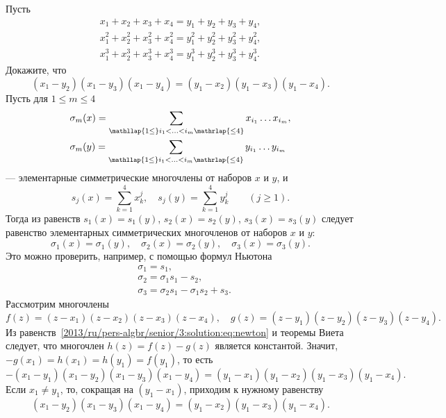 \problem
Пусть
\begin{gather*}
    x_1 + x_2 + x_3 + x_4 = y_1 + y_2 + y_3 + y_4
,\\
    x_1^2 + x_2^2 + x_3^2 + x_4^2
=
    y_1^2 + y_2^2 + y_3^2 + y_4^2
,\\
    x_1^3 + x_2^3 + x_3^3 + x_4^3
=
    y_1^3 + y_2^3 + y_3^3 + y_4^3
.\end{gather*}
Докажите, что
\[
    (x_1 - y_2) (x_1 - y_3) (x_1 - y_4)
=
    (y_1 - x_2) (y_1 - x_3) (y_1 - x_4)
.\]
\solution
Пусть для $1 \leq m \leq 4$
\begin{align*}&
    \sigma_m(x)
=
    \sum\limits_{\mathllap{1 \leq} i_1 < \ldots < i_m \mathrlap{\leq 4}}
        x_{i_1} \ldots x_{i_m}
,\\&
    \sigma_m(y)
=
    \sum\limits_{\mathllap{1 \leq} i_1 < \ldots < i_m \mathrlap{\leq 4}}
        y_{i_1} \ldots y_{i_m}
\end{align*}
--- элементарные симметрические многочлены от наборов $x$ и $y$, и
\[
    s_j(x)
=
    \sum\limits_{k = 1}^{4}
        x_k^j
,\quad
    s_j(y)
=
    \sum\limits_{k = 1}^{4}
        y_k^j
\qquad
    (j \geq 1)
.\]
Тогда из равенств $s_1(x) = s_1(y)$, $s_2(x) = s_2(y)$, $s_3(x) = s_3(y)$
следует равенство элементарных симметрических многочленов
от наборов $x$ и $y$:
\begin{equation} \label{2013/ru/pers-algbr/senior/3:solution:eq:newton}
    \sigma_1(x) = \sigma_1(y)
,\quad
    \sigma_2(x) = \sigma_2(y)
,\quad
    \sigma_3(x) = \sigma_3(y)
.\end{equation}
Это можно проверить, например, с помощью формул Ньютона
\begin{align*}&
    \sigma_1 = s_1
,\\&
    \sigma_2 = \sigma_1 s_1 - s_2
,\\&
    \sigma_3 = \sigma_2 s_1 - \sigma_1 s_2 + s_3
.\end{align*}
Рассмотрим многочлены
\[
    f(z) = (z - x_1) (z - x_2) (z - x_3) (z - x_4)
,\quad
    g(z) = (z - y_1) (z - y_2) (z - y_3) (z - y_4)
.\]
Из равенств~\eqref{2013/ru/pers-algbr/senior/3:solution:eq:newton} и теоремы Виета
следует, что многочлен $h(z) = f(z) - g(z)$ является константой.
Значит, $-g(x_1) = h(x_1) = h(y_1) = f(y_1)$, то есть
\begin{equation}
    - (x_1 - y_1) (x_1-y_2) (x_1 - y_3) (x_1 - y_4)
=
    (y_1 - x_1) (y_1 - x_2) (y_1 - x_3) (y_1 - x_4)
.\end{equation}
Если $x_1 \neq y_1$, то, сокращая на $(y_1 - x_1)$, приходим к нужному
равенству
\begin{equation} \label{2013/ru/pers-algbr/senior/3:solution:eq:desired}
    (x_1 - y_2) (x_1 - y_3) (x_1 - y_4)
=
    (y_1 - x_2) (y_1 - x_3) (y_1 - x_4)
.\end{equation}
